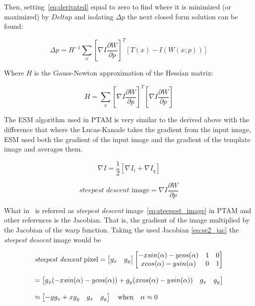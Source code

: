 Then, setting~\ref{eq:derivated} equal to zero to find where it is minimized (or maximized) by $Delta p$ and isolating $\Delta p$ the next closed form solution can be found:

\begin{equation}
  \Delta p = H^{-1} \sum_x \left[\nabla I \frac{\partial W}{\partial p}\right]^T \left[ T(x) - I(W(x;p)) \right]
\end{equation}

Where $H$ is the Gauss-Newton approximation of the Hessian matrix:

\begin{equation}
  H = \sum_x \left[\nabla I \frac{\partial W}{\partial p}\right]^T \left[\nabla I \frac{\partial W}{\partial p}\right]
\end{equation}


The ESM algorithm used in PTAM is very similar to the derived above with the difference that where the Lucas-Kanade takes the gradient from the input image, ESM used both the gradient of the input image and the gradient of the template image and averages them.

\begin{equation}
  \nabla I = \frac{1}{2} \left[\nabla I_t + \nabla I_q \right]
\end{equation}

\begin{equation}
  \textit{steepest descent}\text{ image} = \nabla I \frac{\partial W}{\partial p}
  \label{eq:steepest_image}
\end{equation}

What in~\cite{Baker2004} is referred as \textit{steepest descent} image~\ref{eq:steepest_image} in PTAM and other references is the Jacobian. That is, the gradient of the image multiplied by the Jacobian of the warp function. Taking the used Jacobian \ref{eq:se2_jac} the \textit{steepest descent} image would be

\begin{equation}
  \begin{array}{l l}
  \textit{steepest descent}\text{ pixel} = \begin{bmatrix}  g_x & g_y \end{bmatrix} 
  \begin{bmatrix}
    -xsin(\alpha) - ycos(\alpha) & 1 & 0 \\
    xcos(\alpha) - ysin(\alpha) & 0 & 1 \\
  \end{bmatrix}
  \\ \\=
  \begin{bmatrix}
    g_x(-xsin(\alpha) - ycos(\alpha)) + g_y(xcos(\alpha) - ysin(\alpha)) & g_x & g_y
  \end{bmatrix}
  \\ \\
  \approx
  \begin{bmatrix}
    -y g_x + x g_y & g_x & g_y
  \end{bmatrix}
  \quad \text{when} \quad
  \alpha \approx 0
\end{array}
\end{equation}

